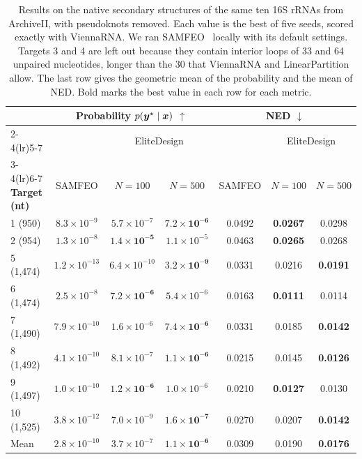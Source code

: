 \begin{table}[H]
\begin{minipage}[t]{0.635\textwidth}
\centering\footnotesize
\renewcommand{\arraystretch}{1.15}
\setlength{\tabcolsep}{1.6pt}
\begin{tabular}{@{}l|ccc|ccc@{}}
\toprule
& \multicolumn{3}{c|}{\textbf{Probability} $p(\boldsymbol{{y}}^\star\mid\boldsymbol{{x}})$ $\uparrow$} & \multicolumn{3}{c}{\textbf{NED} $\downarrow$} \\
\cmidrule(lr){2-4}\cmidrule(lr){5-7}
& & \multicolumn{2}{c|}{EliteDesign} & & \multicolumn{2}{c}{EliteDesign} \\
\cmidrule(lr){3-4}\cmidrule(lr){6-7}
\textbf{Target (nt)} & SAMFEO & $N{=}100$ & $N{=}500$ & SAMFEO & $N{=}100$ & $N{=}500$ \\
\midrule
1 (950) & $8.3{\times}10^{-9}$ & $5.7{\times}10^{-7}$ & $\mathbf{7.2{\times}10^{-6}}$ & 0.0492 & \textbf{0.0267} & 0.0298 \\
2 (954) & $1.3{\times}10^{-8}$ & $\mathbf{1.4{\times}10^{-5}}$ & $1.1{\times}10^{-5}$ & 0.0463 & \textbf{0.0265} & 0.0268 \\
5 (1,474) & $1.2{\times}10^{-13}$ & $6.4{\times}10^{-10}$ & $\mathbf{3.2{\times}10^{-9}}$ & 0.0331 & 0.0216 & \textbf{0.0191} \\
6 (1,474) & $2.5{\times}10^{-8}$ & $\mathbf{7.2{\times}10^{-6}}$ & $5.4{\times}10^{-6}$ & 0.0163 & \textbf{0.0111} & 0.0114 \\
7 (1,490) & $7.9{\times}10^{-10}$ & $1.6{\times}10^{-6}$ & $\mathbf{7.4{\times}10^{-6}}$ & 0.0331 & 0.0185 & \textbf{0.0142} \\
8 (1,492) & $4.1{\times}10^{-10}$ & $8.1{\times}10^{-7}$ & $\mathbf{1.1{\times}10^{-6}}$ & 0.0215 & 0.0145 & \textbf{0.0126} \\
9 (1,497) & $1.0{\times}10^{-10}$ & $\mathbf{1.2{\times}10^{-6}}$ & $1.0{\times}10^{-6}$ & 0.0210 & \textbf{0.0127} & 0.0130 \\
10 (1,525) & $3.8{\times}10^{-12}$ & $7.0{\times}10^{-9}$ & $\mathbf{1.6{\times}10^{-7}}$ & 0.0270 & 0.0207 & \textbf{0.0142} \\
\midrule
Mean & $2.8{\times}10^{-10}$ & $3.7{\times}10^{-7}$ & $\mathbf{1.1{\times}10^{-6}}$ & 0.0309 & 0.0190 & \textbf{0.0176} \\
\bottomrule
\end{tabular}
\caption{Results on the native secondary structures of the same ten 16S rRNAs from ArchiveII, with pseudoknots removed. Each value is the best of five seeds, scored exactly with ViennaRNA. We ran SAMFEO~\citep{zhou2023} locally with its default settings. Targets 3 and 4 are left out because they contain interior loops of 33 and 64 unpaired nucleotides, longer than the 30 that ViennaRNA and LinearPartition allow. The last row gives the geometric mean of the probability and the mean of NED. Bold marks the best value in each row for each metric.}

\end{minipage}
\end{table}
